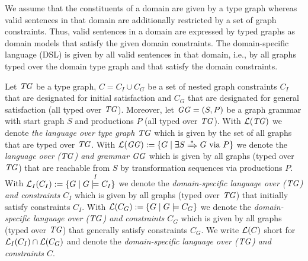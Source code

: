 We assume that the constituents of a domain are given by a type graph whereas valid sentences in that domain are additionally restricted by a set of graph constraints.
Thus, valid sentences in a domain are expressed by typed graphs as domain models that satisfy the given domain constraints.
The domain-specific language (DSL) is given by all valid sentences in that domain, i.e., by all graphs typed over the domain type graph and that satisfy the domain constraints.

\begin{definition}
\label{def:sec-dc-general:lang}
Let $\mathit{TG}$ be a type graph, $C=C_I \cup C_G$ be a set of nested graph constraints $C_I$ that are designated for initial satisfaction and $C_G$ that are designated for general satisfaction (all typed over $\mathit{TG}$).
Moreover, let $\mathit{GG}=(S,P)$ be a graph grammar with start graph $S$ and productions $P$ (all typed over $\mathit{TG}$).
With $\mathcal{L}(\mathit{TG})$ we denote \emph{the language over type graph $\mathit{TG}$} which is given by the set of all graphs that are typed over $\mathit{TG}$.
With $\Lang(\GG):=\{G \mid \exists S \Trans{*} G \text{ via } P\}$ we denote the \emph{language over ($\mathit{TG}$) and grammar $\mathit{GG}$} which is given by all graphs (typed over $\mathit{TG}$) that are reachable from $S$ by transformation sequences via productions $P$.
With $\mathcal{L}_I(C_I):=\{G \mid G \stackrel{I}{\models} C_I\}$ we denote the \emph{domain-specific language over ($\mathit{TG}$) and constraints $C_I$} which is given by all graphs (typed over $\mathit{TG}$) that initially satisfy constraints $C_I$.
With $\mathcal{L}(C_G):=\{G \mid G \models C_G\}$ we denote the \emph{domain-specific language over ($\mathit{TG}$) and constraints $C_G$} which is given by all graphs (typed over $\mathit{TG}$) that generally satisfy constraints $C_G$.
We write $\mathcal{L}(C)$ short for $\mathcal{L}_I(C_I) \cap \mathcal{L}(C_G)$ and denote the \emph{domain-specific language over ($\mathit{TG}$) and constraints $C$}.
\envEndMarker
\end{definition}

